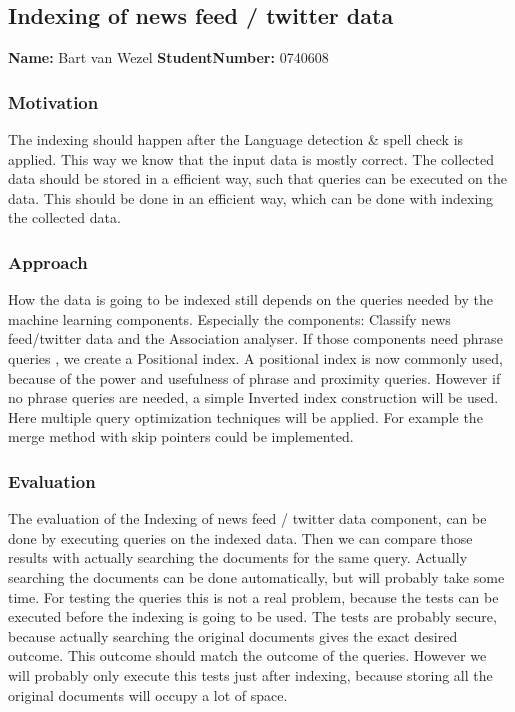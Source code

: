 \subsection{Indexing of news feed / twitter data   }
\textbf{Name:} Bart van Wezel  \textbf{StudentNumber:} 0740608

\subsubsection*{Motivation}
The indexing should happen after the Language detection \& spell check is applied. This way we know that the input data is mostly correct.  The collected data should be stored in a efficient way, such that queries can be executed on the data. This should be done in an efficient way, which can be done with indexing the collected data. 

\subsubsection*{Approach}
How the data is going to be indexed still depends on the queries needed by the machine learning components. Especially the components: Classify news feed/twitter data and the Association analyser. If those components need phrase queries , we create a Positional index.  A positional index is now commonly used, because of the power and usefulness of phrase and proximity queries. However if no phrase queries are needed, a simple Inverted index construction will be used. Here multiple query optimization techniques will be applied. For example the merge method with skip pointers could be implemented. 

\subsubsection*{Evaluation }
The evaluation of the Indexing of news feed / twitter data component, can be done by executing queries on the indexed data. Then we can compare those results with actually searching the documents for the same query. Actually searching the documents can be done automatically, but will probably take some time. For testing the queries this is not a real problem, because the tests can be executed before the indexing is going to be used. The tests are probably secure, because actually searching the original documents gives the exact desired outcome. This outcome should match the outcome of the queries. However we will probably only execute this tests just after indexing, because storing all the original documents will occupy a lot of space. 
